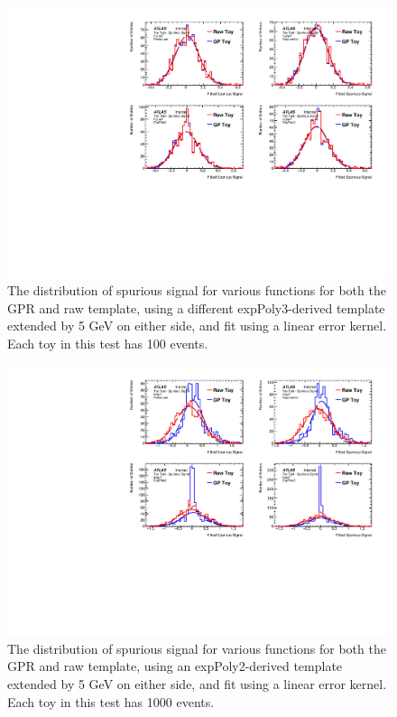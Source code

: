 \begin{figure} 
\begin{center}
  \includegraphics[width=\textwidth]{figures/background/gpr/validation/linear/ToyTest_FitSigVals_highpT_100_noSig}   
\caption{The distribution of spurious signal for various functions for both the GPR and raw template, using a different expPoly3-derived template extended by 5 GeV on either side, and fit using a linear error kernel. Each toy in this test has 100 events.}
\label{fig:linearkernel_highpt_100_noSig}
\end{center}
\end{figure}

\begin{figure} 
\begin{center}
  \includegraphics[width=\textwidth]{figures/background/gpr/validation/linear/ToyTest_FitSigVals_lowpT_1000_noSig}   
\caption{The distribution of spurious signal for various functions for both the GPR and raw template, using an expPoly2-derived template extended by 5 GeV on either side, and fit using a linear error kernel. Each toy in this test has 1000 events.}
\label{fig:linearkernel_lowpt_1000_noSig}
\end{center}
\end{figure}

